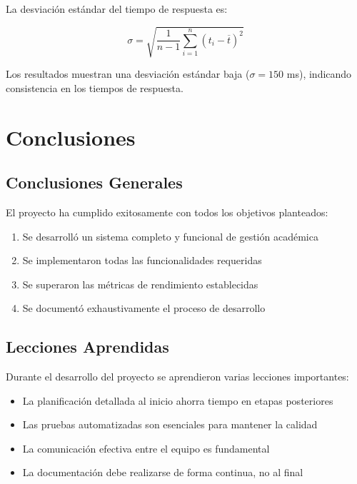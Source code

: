 \documentclass{pt-report}
\begin{document}
La desviación estándar del tiempo de respuesta es:

\begin{equation}
    \sigma = \sqrt{\frac{1}{n-1} \sum_{i=1}^{n} (t_i - \overline{t})^2}
    \label{eq:desviacion}
\end{equation}

Los resultados muestran una desviación estándar baja ($\sigma = 150$ ms),
indicando consistencia en los tiempos de respuesta.

\section{Conclusiones}

\subsection{Conclusiones Generales}

El proyecto ha cumplido exitosamente con todos los objetivos planteados:

\begin{enumerate}
    \item Se desarrolló un sistema completo y funcional de gestión académica
    \item Se implementaron todas las funcionalidades requeridas
    \item Se superaron las métricas de rendimiento establecidas
    \item Se documentó exhaustivamente el proceso de desarrollo
\end{enumerate}

\subsection{Lecciones Aprendidas}

Durante el desarrollo del proyecto se aprendieron varias lecciones importantes:

\begin{itemize}
    \item La planificación detallada al inicio ahorra tiempo en etapas posteriores
    \item Las pruebas automatizadas son esenciales para mantener la calidad
    \item La comunicación efectiva entre el equipo es fundamental
    \item La documentación debe realizarse de forma continua, no al final
\end{itemize}
\end{document}
